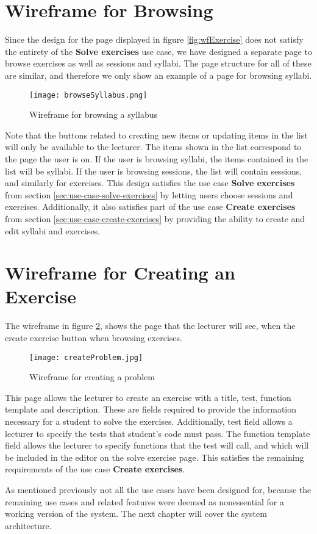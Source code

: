 \section{Wireframe for Browsing}
Since the design for the page displayed in figure \ref{fig:wfExercise} does not satisfy the entirety of the \textbf{Solve exercises} use case, we have designed a separate page to browse exercises as well as sessions and syllabi. The page structure for all of these are similar, and therefore we only show an example of a page for browsing syllabi.
\begin{figure}[H]
    \texttt{[image: browseSyllabus.png]}
    \centering
    \caption{Wireframe for browsing a syllabus}
    \label{fig:wfSyllabus}
\end{figure}
Note that the buttons related to creating new items or updating items in the list will only be available to the lecturer. The items shown in the list correspond to the page the user is on. If the user is browsing syllabi, the items contained in the list will be syllabi. If the user is browsing sessions, the list will contain sessions, and similarly for exercises. This design satisfies the use case \textbf{Solve exercises} from section \ref{sec:use-case-solve-exercises} by letting users choose sessions and exercises. Additionally, it also satisfies part of the use case \textbf{Create exercises} from section \ref{sec:use-case-create-exercises} by providing the ability to create and edit syllabi and exercises.

\section{Wireframe for Creating an Exercise}
The wireframe in figure \ref{fig:wfProblem}, shows the page that the lecturer will see, when the create exercise button when browsing exercises.
\begin{figure}[H]
	\texttt{[image: createProblem.jpg]}
	\centering
	\caption{Wireframe for creating a problem}
	\label{fig:wfProblem}
\end{figure}

This page allows the lecturer to create an exercise with a title, test, function template and description. These are fields required to provide the information necessary for a student to solve the exercises. Additionally, test field allows a lecturer to specify the tests that student's code must pass. The function template field allows the lecturer to specify functions that the test will call, and which will be included in the editor on the solve exercise page. This satisfies the remaining requirements of the use case \textbf{Create exercises}.

As mentioned previously not all the use cases have been designed for, because the remaining use cases and related features were deemed as nonessential for a working version of the system. The next chapter will cover the system architecture.
